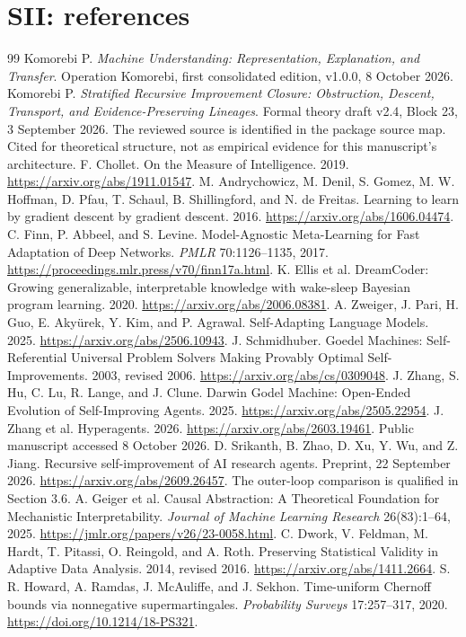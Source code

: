 \documentclass[11pt,oneside,openany]{book}
\numberwithin{equation}{section}
\begin{document}
\chapter{SII: references}
\begin{thebibliography}{99}\fontsize{9.5}{11.2}\selectfont\setlength{\itemsep}{3pt}\setlength{\parskip}{0pt}
 Komorebi P. \emph{Machine Understanding: Representation, Explanation, and Transfer}. Operation Komorebi, first consolidated edition, v1.0.0, 8 October 2026.
 Komorebi P. \emph{Stratified Recursive Improvement Closure: Obstruction, Descent, Transport, and Evidence-Preserving Lineages}. Formal theory draft v2.4, Block 23, 3 September 2026. The reviewed source is identified in the package source map. Cited for theoretical structure, not as empirical evidence for this manuscript's architecture.
 F. Chollet. On the Measure of Intelligence. 2019. \url{https://arxiv.org/abs/1911.01547}.
 M. Andrychowicz, M. Denil, S. Gomez, M. W. Hoffman, D. Pfau, T. Schaul, B. Shillingford, and N. de Freitas. Learning to learn by gradient descent by gradient descent. 2016. \url{https://arxiv.org/abs/1606.04474}.
 C. Finn, P. Abbeel, and S. Levine. Model-Agnostic Meta-Learning for Fast Adaptation of Deep Networks. \emph{PMLR} 70:1126--1135, 2017. \url{https://proceedings.mlr.press/v70/finn17a.html}.
 K. Ellis et al. DreamCoder: Growing generalizable, interpretable knowledge with wake-sleep Bayesian program learning. 2020. \url{https://arxiv.org/abs/2006.08381}.
 A. Zweiger, J. Pari, H. Guo, E. Aky\"urek, Y. Kim, and P. Agrawal. Self-Adapting Language Models. 2025. \url{https://arxiv.org/abs/2506.10943}.
 J. Schmidhuber. Goedel Machines: Self-Referential Universal Problem Solvers Making Provably Optimal Self-Improvements. 2003, revised 2006. \url{https://arxiv.org/abs/cs/0309048}.
 J. Zhang, S. Hu, C. Lu, R. Lange, and J. Clune. Darwin Godel Machine: Open-Ended Evolution of Self-Improving Agents. 2025. \url{https://arxiv.org/abs/2505.22954}.
 J. Zhang et al. Hyperagents. 2026. \url{https://arxiv.org/abs/2603.19461}. Public manuscript accessed 8 October 2026.
 D. Srikanth, B. Zhao, D. Xu, Y. Wu, and Z. Jiang. Recursive self-improvement of AI research agents. Preprint, 22 September 2026. \url{https://arxiv.org/abs/2609.26457}. The outer-loop comparison is qualified in Section 3.6.
 A. Geiger et al. Causal Abstraction: A Theoretical Foundation for Mechanistic Interpretability. \emph{Journal of Machine Learning Research} 26(83):1--64, 2025. \url{https://jmlr.org/papers/v26/23-0058.html}.
 C. Dwork, V. Feldman, M. Hardt, T. Pitassi, O. Reingold, and A. Roth. Preserving Statistical Validity in Adaptive Data Analysis. 2014, revised 2016. \url{https://arxiv.org/abs/1411.2664}.
 S. R. Howard, A. Ramdas, J. McAuliffe, and J. Sekhon. Time-uniform Chernoff bounds via nonnegative supermartingales. \emph{Probability Surveys} 17:257--317, 2020. \url{https://doi.org/10.1214/18-PS321}.


\end{thebibliography}
\end{document}
